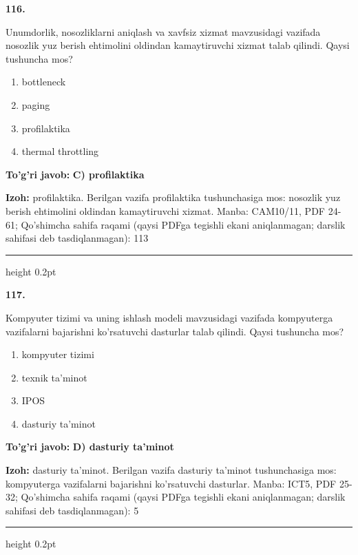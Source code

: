 \documentclass[10pt,a4paper]{article}
\begin{document}
{\bfseries\sffamily\color{ink} 116.}
\par
Unumdorlik, nosozliklarni aniqlash va xavfsiz xizmat mavzusidagi vazifada nosozlik yuz berish ehtimolini oldindan kamaytiruvchi xizmat talab qilindi. Qaysi tushuncha mos?
\begin{enumerate}[label=\Alph*),leftmargin=9mm]
\item bottleneck
\item paging
\item profilaktika
\item thermal throttling
\end{enumerate}
\begin{tcolorbox}[enhanced,breakable,colback=teal!4,colframe=teal!60!black,boxrule=0.45pt,arc=1.2mm,left=2.7mm,right=2.7mm,top=1.8mm,bottom=1.8mm,before skip=2mm,after skip=2mm]
{\bfseries\sffamily\color{teal}To'g'ri javob:} \textbf{C) profilaktika}
\par\smallskip
{\bfseries Izoh:} profilaktika. Berilgan vazifa profilaktika tushunchasiga mos: nosozlik yuz berish ehtimolini oldindan kamaytiruvchi xizmat. Manba: CAM10/11, PDF 24-61; Qo'shimcha sahifa raqami (qaysi PDFga tegishli ekani aniqlanmagan; darslik sahifasi deb tasdiqlanmagan): 113
\end{tcolorbox}
\vspace{2mm}\hrule height 0.2pt\vspace{3mm}

{\bfseries\sffamily\color{ink} 117.}
\par
Kompyuter tizimi va uning ishlash modeli mavzusidagi vazifada kompyuterga vazifalarni bajarishni ko'rsatuvchi dasturlar talab qilindi. Qaysi tushuncha mos?
\begin{enumerate}[label=\Alph*),leftmargin=9mm]
\item kompyuter tizimi
\item texnik ta'minot
\item IPOS
\item dasturiy ta'minot
\end{enumerate}
\begin{tcolorbox}[enhanced,breakable,colback=teal!4,colframe=teal!60!black,boxrule=0.45pt,arc=1.2mm,left=2.7mm,right=2.7mm,top=1.8mm,bottom=1.8mm,before skip=2mm,after skip=2mm]
{\bfseries\sffamily\color{teal}To'g'ri javob:} \textbf{D) dasturiy ta'minot}
\par\smallskip
{\bfseries Izoh:} dasturiy ta'minot. Berilgan vazifa dasturiy ta'minot tushunchasiga mos: kompyuterga vazifalarni bajarishni ko'rsatuvchi dasturlar. Manba: ICT5, PDF 25-32; Qo'shimcha sahifa raqami (qaysi PDFga tegishli ekani aniqlanmagan; darslik sahifasi deb tasdiqlanmagan): 5
\end{tcolorbox}
\vspace{2mm}\hrule height 0.2pt\vspace{3mm}
\end{document}
